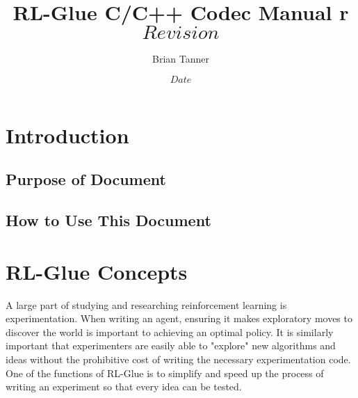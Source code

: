 \documentclass[11pt]{article}
\title{RL-Glue C/C++ Codec Manual r $Revision$}
\author{Brian Tanner}
\date{$Date$}                                           %
\begin{document}
\maketitle
\tableofcontents


\section{Introduction}
\subsection{Purpose of Document}
\subsection{How to Use This Document}
\section{RL-Glue Concepts}

A large part of studying and researching reinforcement learning is experimentation. When writing an agent, ensuring it makes exploratory moves to discover the world is important to achieving an optimal policy. It is similarly important that experimenters are easily able to "explore" new algorithms and ideas without the prohibitive cost of writing the necessary experimentation code. One of the functions of RL-Glue is to simplify and speed up the process of writing an experiment so that every idea can be tested. 
\end{document}
